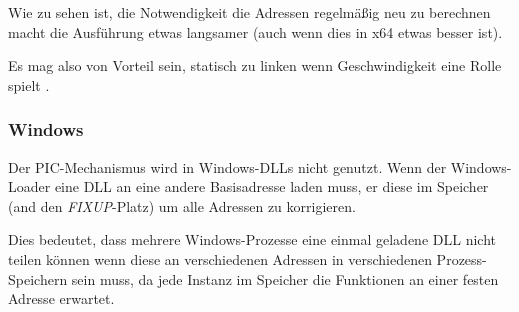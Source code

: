 Wie zu sehen ist, die Notwendigkeit die Adressen regelmäßig neu zu berechnen macht die Ausführung
etwas langsamer (auch wenn dies in x64 etwas besser ist).

Es mag also von Vorteil sein, statisch zu linken wenn Geschwindigkeit eine Rolle spielt .

\subsubsection{Windows}

Der PIC-Mechanismus wird in Windows-DLLs nicht genutzt. Wenn der Windows-Loader eine DLL an
eine andere Basisadresse laden muss,  er diese im Speicher (and den \emph{FIXUP}-Platz)
um alle Adressen zu korrigieren.

Dies bedeutet, dass mehrere Windows-Prozesse eine einmal geladene DLL nicht teilen können
wenn diese an verschiedenen Adressen in verschiedenen Prozess-Speichern sein muss, da
jede Instanz im Speicher die Funktionen an einer festen Adresse erwartet.
